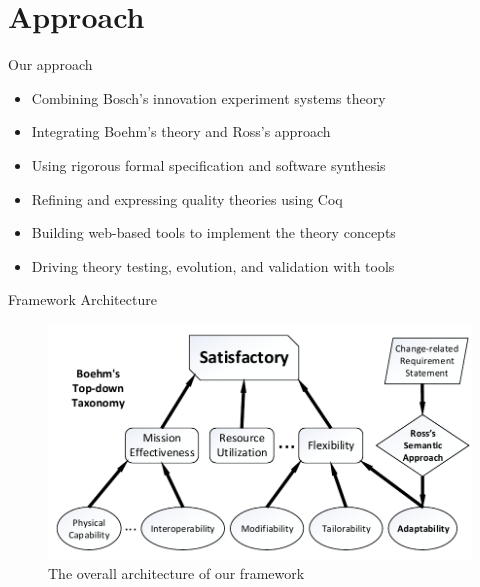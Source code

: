 \documentclass[xcolor=x11names,compress]{beamer}
\renewcommand{\(}{\begin{columns}}
\renewcommand{\)}{\end{columns}}
\newcommand{\<}[1]{\begin{column}{#1}}
\renewcommand{\>}{\end{column}}
\begin{document}
\section{Approach}
\begin{frame}{Our approach}
\begin{itemize}
		\item Combining Bosch's innovation experiment systems  theory
        \item Integrating Boehm's theory and Ross's approach
		\item Using rigorous formal specification and software synthesis
		\item Refining and expressing quality theories using Coq
		\item Building web-based tools to implement the theory concepts
		\item Driving theory testing, evolution, and validation with tools
\end{itemize}
\end{frame}

\begin{frame}{Framework Architecture}
\begin{figure}
\includegraphics[scale=0.6]{figures/architecture}
\caption{The overall architecture of our framework}
\end{figure}
\end{frame}

\end{document}
